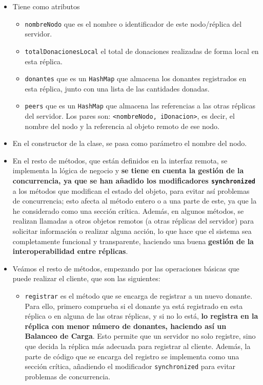 \documentclass[a4paper,12pt]{article}
\begin{document}
				\begin{itemize}
					\item Tiene como atributos
					\begin{itemize}
						\item \texttt{nombreNodo} que es el nombre o identificador de este nodo/réplica del servidor.
						\item \texttt{totalDonacionesLocal} el total de donaciones realizadas de forma local en esta réplica.
						\item \texttt{donantes} que es un \texttt{HashMap} que almacena los donantes registrados en esta réplica, junto con una lista de las cantidades donadas.
						\item \texttt{peers} que es un \texttt{HashMap} que almacena las referencias a las otras réplicas del servidor. Los pares son: \texttt{<nombreNodo, iDonacion>}, es decir, el nombre del nodo y la referencia al objeto remoto de ese nodo.
					\end{itemize}

					\item En el constructor de la clase, se pasa como parámetro el nombre del nodo.
					\item En el resto de métodos, que están definidos en la interfaz remota, se implementa la lógica de negocio y \textbf{se tiene en cuenta la gestión de la concurrencia, ya que se han añadido los modificadores \texttt{synchronized}} a los métodos que modifican el estado del objeto, para evitar así problemas de concurrencia; esto afecta al método entero o a una parte de este, ya que la he considerado como una sección crítica. Además, en algunos métodos, se realizan llamadas a otros objetos remotos (a otras réplicas del servidor) para solicitar información o realizar alguna acción, lo que hace que el sistema sea completamente funcional y transparente, haciendo una buena \textbf{gestión de la interoperabilidad entre réplicas}. 
					\item Veámos el resto de métodos, empezando por las operaciones básicas que puede realizar el cliente, que son las siguientes:
					\begin{itemize}
						\item \texttt{registrar} es el método que se encarga de registrar a un nuevo donante. Para ello, primero comprueba si el donante ya está registrado en esta réplica o en alguna de las otras réplicas, y si no lo está, \textbf{lo registra en la réplica con menor número de donantes, haciendo así un Balanceo de Carga}. Esto permite que un servidor no solo registre, sino que decida la réplica más adecuada para registrar al cliente. Además, la parte de código que se encarga del registro se implementa como una sección crítica, añadiendo el modificador \texttt{synchronized} para evitar problemas de concurrencia.
						

\end{itemize}
\end{itemize}
\end{document}
